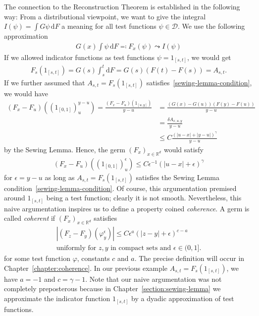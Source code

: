 The connection to the Reconstruction Theorem is established in the following way: From a distributional viewpoint, we want to give the integral \(I(\psi) = \int G \psi \, \mathrm{d}F\) a meaning for all test functions \( \psi \in \mathcal{D} \). We use the following approximation
\begin{align*}
    G(x)\int \psi \, \mathrm{d}F \eqqcolon F_x(\psi)  \leadsto I(\psi)
\end{align*}
If we allowed indicator functions as test functions \(\psi = 1_{[s,t]}\), we would get
\begin{align*}
    F_s(1_{[s,t]}) = G(s) \int^t_s \mathrm{d}F = G(s)(F(t) - F(s)) = A_{s,t}.
\end{align*}
If we further assumed that \(A_{s,t} = F_s(1_{[s,t]})\) satisfies~\eqref{sewing-lemma-condition}, we would have 
\begin{align*}
    (F_x - F_u)({(1_{[0,1]})}^{y-u}_u) = \frac{(F_x - F_u)(1_{[u,y]})}{y-u} &= \frac{(G(x) - G(u))(F(y) - F(u))}{y-u} \\
    &= \frac{\delta A_{x,u,y}}{y-u}\\
    &\leq C \frac{ {(|u-x| + |y-u|)}^\gamma}{y-u}
\end{align*} 
by the Sewing Lemma. Hence, the germ \({(F_x)}_{x \in \mathbb{R}^d}\) would satisfy
\begin{align*}
    (F_x - F_u)({(1_{[0,1]})}^{\epsilon}_u) \leq C \epsilon^{-1}{(|u-x| + \epsilon)}^\gamma
\end{align*}
for \(\epsilon = y-u\) as long as \(A_{s,t} = F_s(1_{[s,t]})\) satisfies the Sewing Lemma condition~\eqref{sewing-lemma-condition}. Of course, this argumentation premised around \( 1_{[s,t]} \) being a test function; clearly it is not smooth. Nevertheless, this naive argumentation inspires us to define a property coined \emph{coherence}. A germ is called \emph{coherent} if \( (F_x)_{x \in \mathbb{R}^d} \) satisfies
\begin{gather}\label{pre-condition-coherence}
    |(F_z - F_y)(\varphi^\epsilon_y)| \leq C\epsilon^{a}{(|z-y| + \epsilon)}^{c - a}  \\ \text{uniformly for \(z,y\) in compact sets and \(\epsilon \in (0,1]\)} \nonumber. %
\end{gather}
for some test function \(\varphi\), constants  \(c\) and \(a\).
The precise definition will occur in Chapter~\ref{chapter:coherence}. In our previous example \(A_{s,t} = F_s(1_{[s,t]})\), we have \(a = -1\) and \(c = \gamma - 1\). Note that our naive argumentation was not completely preposterous because in Chapter~\ref{section:sewing-lemma} we approximate the indicator function \( 1_{[s,t]} \) by a dyadic approximation of test functions.

